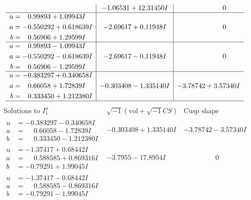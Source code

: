\documentclass[1p]{elsarticle_modified}
\theoremstyle{definition}
\newcommand{\I}{\sqrt{-1}}
\begin{document}
$$\begin{array}{c|c|c}
 & -1.06531 + 12.31450 I & \phantom{-0.000000 } 0 \\ \hline\begin{aligned}
u &= \phantom{-}0.99893 + 1.09943 I \\
a &= -0.550292 + 0.618639 I \\
b &= \phantom{-}0.56906 + 1.29599 I\end{aligned}
 & -2.69617 + 0.11948 I & \phantom{-0.000000 } 0 \\ \hline\begin{aligned}
u &= \phantom{-}0.99893 - 1.09943 I \\
a &= -0.550292 - 0.618639 I \\
b &= \phantom{-}0.56906 - 1.29599 I\end{aligned}
 & -2.69617 - 0.11948 I & \phantom{-0.000000 } 0 \\ \hline\begin{aligned}
u &= -0.383297 + 0.340658 I \\
a &= \phantom{-}0.66058 + 1.72839 I \\
b &= \phantom{-}0.333450 + 1.212380 I\end{aligned}
 & -0.303408 - 1.335140 I & -3.78742 + 3.57340 I\\
 \hline 
 \end{array}$$\newpage$$\begin{array}{c|c|c}  
\text{Solutions to }I^u_{1}& \I (\text{vol} + \sqrt{-1}CS) & \text{Cusp shape}\\
 \hline 
\begin{aligned}
u &= -0.383297 - 0.340658 I \\
a &= \phantom{-}0.66058 - 1.72839 I \\
b &= \phantom{-}0.333450 - 1.212380 I\end{aligned}
 & -0.303408 + 1.335140 I & -3.78742 - 3.57340 I \\ \hline\begin{aligned}
u &= -1.37417 + 0.68442 I \\
a &= \phantom{-}0.588585 + 0.869316 I \\
b &= -0.79291 + 1.99045 I\end{aligned}
 & -3.7955 - 17.8954 I & \phantom{-0.000000 } 0 \\ \hline\begin{aligned}
u &= -1.37417 - 0.68442 I \\
a &= \phantom{-}0.588585 - 0.869316 I \\
b &= -0.79291 - 1.99045 I\end{aligned}

\end{array}$$
\end{document}
